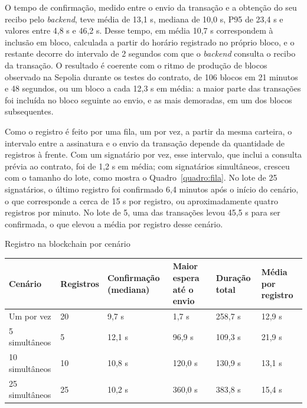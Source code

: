 \documentclass[
    12pt,
    a4paper,
    oneside,
    chapter=TITLE,
    section=TITLE,
    subsection=TITLE,
    subsubsection=TITLE,
    sumario=tradicional,
    english,
    brazil
]{abntex2}
\begin{document}
O tempo de confirmação, medido entre o envio da transação e a obtenção do seu recibo pelo \emph{backend}, teve média de 13,1 s, mediana de 10,0 s, P95 de 23,4 s e valores entre 4,8 s e 46,2 s. Desse tempo, em média 10,7 s correspondem à inclusão em bloco, calculada a partir do horário registrado no próprio bloco, e o restante decorre do intervalo de 2 segundos com que o \emph{backend} consulta o recibo da transação. O resultado é coerente com o ritmo de produção de blocos observado na Sepolia durante os testes do contrato, de 106 blocos em 21 minutos e 48 segundos, ou um bloco a cada 12,3 s em média: a maior parte das transações foi incluída no bloco seguinte ao envio, e as mais demoradas, em um dos blocos subsequentes.

Como o registro é feito por uma fila, um por vez, a partir da mesma carteira, o intervalo entre a assinatura e o envio da transação depende da quantidade de registros à frente. Com um signatário por vez, esse intervalo, que inclui a consulta prévia ao contrato, foi de 1,2 s em média; com signatários simultâneos, cresceu com o tamanho do lote, como mostra o Quadro~\ref{quadro:fila}. No lote de 25 signatários, o último registro foi confirmado 6,4 minutos após o início do cenário, o que corresponde a cerca de 15 s por registro, ou aproximadamente quatro registros por minuto. No lote de 5, uma das transações levou 45,5 s para ser confirmada, o que elevou a média por registro desse cenário.

\begin{quadro}[htb]
    \caption{Registro na blockchain por cenário}
    \label{quadro:fila}
    \centering
    \small
    \begin{tabular}{L{2.4cm}L{1.9cm}L{2.5cm}L{2.4cm}L{1.9cm}L{1.9cm}}
        \toprule
        \textbf{Cenário} & \textbf{Registros} & \textbf{Confirmação (mediana)} & \textbf{Maior espera até o envio} & \textbf{Duração total} & \textbf{Média por registro} \\
        \midrule
        Um por vez & 20 & 9,7 s & 1,7 s & 258,7 s & 12,9 s \\
        5 simultâneos & 5 & 12,1 s & 96,9 s & 109,3 s & 21,9 s \\
        10 simultâneos & 10 & 10,8 s & 120,0 s & 130,9 s & 13,1 s \\
        25 simultâneos & 25 & 10,2 s & 360,0 s & 383,8 s & 15,4 s \\
        \bottomrule
    \end{tabular}
\end{quadro}
\end{document}

